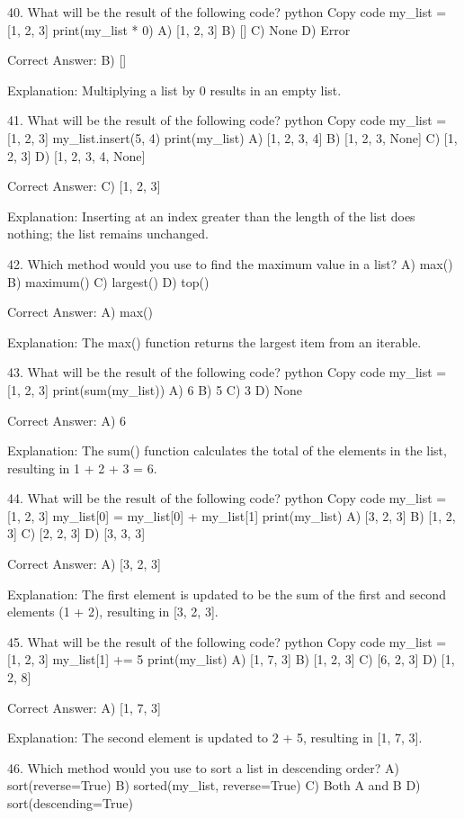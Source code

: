 40. What will be the result of the following code?
python
Copy code
my_list = [1, 2, 3]
print(my_list * 0)
A) [1, 2, 3]
B) []
C) None
D) Error

Correct Answer: B) []

Explanation:
Multiplying a list by 0 results in an empty list.

41. What will be the result of the following code?
python
Copy code
my_list = [1, 2, 3]
my_list.insert(5, 4)
print(my_list)
A) [1, 2, 3, 4]
B) [1, 2, 3, None]
C) [1, 2, 3]
D) [1, 2, 3, 4, None]

Correct Answer: C) [1, 2, 3]

Explanation:
Inserting at an index greater than the length of the list does nothing; the list remains unchanged.

42. Which method would you use to find the maximum value in a list?
A) max()
B) maximum()
C) largest()
D) top()

Correct Answer: A) max()

Explanation:
The max() function returns the largest item from an iterable.

43. What will be the result of the following code?
python
Copy code
my_list = [1, 2, 3]
print(sum(my_list))
A) 6
B) 5
C) 3
D) None

Correct Answer: A) 6

Explanation:
The sum() function calculates the total of the elements in the list, resulting in 1 + 2 + 3 = 6.

44. What will be the result of the following code?
python
Copy code
my_list = [1, 2, 3]
my_list[0] = my_list[0] + my_list[1]
print(my_list)
A) [3, 2, 3]
B) [1, 2, 3]
C) [2, 2, 3]
D) [3, 3, 3]

Correct Answer: A) [3, 2, 3]

Explanation:
The first element is updated to be the sum of the first and second elements (1 + 2), resulting in [3, 2, 3].

45. What will be the result of the following code?
python
Copy code
my_list = [1, 2, 3]
my_list[1] += 5
print(my_list)
A) [1, 7, 3]
B) [1, 2, 3]
C) [6, 2, 3]
D) [1, 2, 8]

Correct Answer: A) [1, 7, 3]

Explanation:
The second element is updated to 2 + 5, resulting in [1, 7, 3].

46. Which method would you use to sort a list in descending order?
A) sort(reverse=True)
B) sorted(my_list, reverse=True)
C) Both A and B
D) sort(descending=True)

